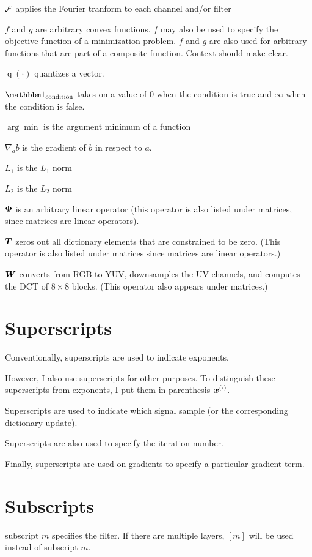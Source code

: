 \documentclass{article}
\begin{document}
$\mathcal{F}$ applies the Fourier tranform to each channel and/or filter

$f$ and $g$ are arbitrary convex functions. $f$ may also be used to specify the objective function of a minimization problem. $f$ and $g$ are also used for arbitrary functions that are part of a composite function. Context should make clear.

$\operatorname{q}(\cdot)$ quantizes a vector.

$\indicator_{\text{condition}}$ takes on a value of $0$ when the condition is true and $\infty$ when the condition is false.

$\arg \min$ is the argument minimum of a function 

$\nabla_{a} b$ is the gradient of $b$ in respect to $a$.

$L_1$ is the $L_1$ norm

$L_2$ is the $L_2$ norm

$\bm{\Phi}$ is an arbitrary linear operator (this operator is also listed under matrices, since matrices are linear operators).

$\bm{T}$ zeros out all dictionary elements that are constrained to be zero. (This operator is also listed under matrices since matrices are linear operators.)

$\bm{W}$ converts from RGB to YUV, downsamples the UV channels, and computes the DCT  of $8 \times 8$ blocks. (This operator also appears under matrices.)

\section{Superscripts}
Conventionally, superscripts are used to indicate exponents.

However, I also use superscripts for other purposes.  To distinguish these superscripts from exponents, I put them in parenthesis $\bm{x}^{(\cdot)}$.

Superscripts are used to indicate which signal sample (or the corresponding dictionary update).

Superscripts are also used to specify the iteration number.

Finally, superscripts are used on gradients to specify a particular gradient term.

\section{Subscripts}
subscript $m$ specifies the filter. If there are multiple layers, $[m]$ will be used instead of subscript $m$.
\end{document}
